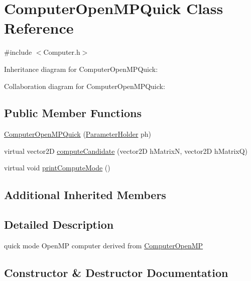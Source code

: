 \hypertarget{classComputerOpenMPQuick}{}\section{Computer\+Open\+M\+P\+Quick Class Reference}
\label{classComputerOpenMPQuick}


{\ttfamily \#include $<$Computer.\+h$>$}



Inheritance diagram for Computer\+Open\+M\+P\+Quick\+:


Collaboration diagram for Computer\+Open\+M\+P\+Quick\+:
\subsection*{Public Member Functions}
\begin{DoxyCompactItemize}
\item 
\hyperlink{classComputerOpenMPQuick_a4a6149b53f79c0c09d1526fa3d629d75}{Computer\+Open\+M\+P\+Quick} (\hyperlink{structParameterHolder}{Parameter\+Holder} ph)
\item 
virtual vector2D \hyperlink{classComputerOpenMPQuick_ae73b5e3ef4557e403358e934a97bbb19}{compute\+Candidate} (vector2D h\+MatrixN, vector2D h\+MatrixQ)
\item 
virtual void \hyperlink{classComputerOpenMPQuick_a683f867b07a3b0e5811f28db83225cea}{print\+Compute\+Mode} ()
\end{DoxyCompactItemize}
\subsection*{Additional Inherited Members}


\subsection{Detailed Description}
quick mode Open\+MP computer derived from \hyperlink{classComputerOpenMP}{Computer\+Open\+MP} 

\subsection{Constructor \& Destructor Documentation}
